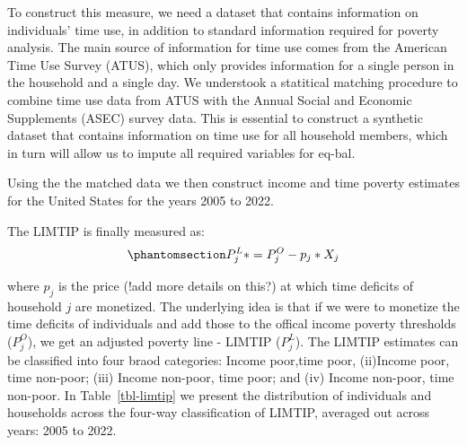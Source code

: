 \documentclass[
  11pt,
]{article}
\begin{document}
To construct this measure, we need a dataset that contains information
on individuals' time use, in addition to standard information required
for poverty analysis. The main source of information for time use comes
from the American Time Use Survey (ATUS), which only provides
information for a single person in the household and a single day. We
understook a statitical matching procedure to combine time use data from
ATUS with the Annual Social and Economic Supplements (ASEC) survey data.
This is essential to construct a synthetic dataset that contains
information on time use for all household members, which in turn will
allow us to impute all required variables for eq-bal.

Using the the matched data we then construct income and time poverty
estimates for the United States for the years 2005 to 2022.

The LIMTIP is finally measured as:
\begin{equation}\phantomsection\label{eq-limtip}{P_{j}^L* = P_{j}^O- p_{j}*X_{j}
}\end{equation}

where \(p_{j}\) is the price (!add more details on this?) at which time
deficits of household \({j}\) are monetized. The underlying idea is that
if we were to monetize the time deficits of individuals and add those to
the offical income poverty thresholds (\(P_{j}^O\)), we get an adjusted
poverty line - LIMTIP (\(P_{j}^L\)). The LIMTIP estimates can be
classified into four braod categories: Income poor,time poor, (ii)Income
poor, time non-poor; (iii) Income non-poor, time poor; and (iv) Income
non-poor, time non-poor. In Table~\ref{tbl-limtip} we present the
distribution of individuals and households across the four-way
classification of LIMTIP, averaged out across years: 2005 to 2022.

\begin{table}

\caption{\label{tbl-limtip}\textbf{Four-way classification, LIMTIP }}


\end{table}%
\end{document}
